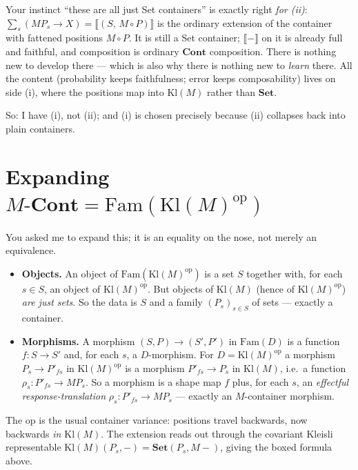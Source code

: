 \documentclass[11pt]{article}
\newcommand{\Set}{\mathbf{Set}}
\newcommand{\Cont}{\mathbf{Cont}}
\newcommand{\Kl}{\mathrm{Kl}}
\newcommand{\Fam}{\mathrm{Fam}}
\newcommand{\ext}[1]{\llbracket #1 \rrbracket}
\theoremstyle{definition}
\begin{document}
Your instinct ``these are all just Set containers'' is exactly right \emph{for (ii)}: $\sum_s(MP_s\to X)
= \ext{(S,\,M\circ P)}$ is the ordinary extension of the container with fattened positions $M\circ P$.
It is still a Set container; $\ext{-}$ on it is already full and faithful, and composition is ordinary
$\Cont$ composition. There is nothing new to develop there --- which is also why there is nothing new
to \emph{learn} there. All the content (probability keeps faithfulness; error keeps composability) lives
on side (i), where the positions map into $\Kl(M)$ rather than $\Set$.

So: I have (i), not (ii); and (i) is chosen precisely because (ii) collapses back into plain containers.

\section{Expanding $M\text{-}\Cont = \Fam(\Kl(M)^{\mathrm{op}})$}
You asked me to expand this; it is an equality on the nose, not merely an equivalence.
\begin{itemize}
  \item \textbf{Objects.} An object of $\Fam(\Kl(M)^{\mathrm{op}})$ is a set $S$ together with, for each
  $s\in S$, an object of $\Kl(M)^{\mathrm{op}}$. But objects of $\Kl(M)$ (hence of $\Kl(M)^{\mathrm{op}}$)
  \emph{are just sets}. So the data is $S$ and a family $(P_s)_{s\in S}$ of sets --- exactly a container.
  \item \textbf{Morphisms.} A morphism $(S,P)\to(S',P')$ in $\Fam(D)$ is a function $f:S\to S'$ and, for
  each $s$, a $D$-morphism. For $D=\Kl(M)^{\mathrm{op}}$ a morphism $P_s \to P'_{fs}$ in
  $\Kl(M)^{\mathrm{op}}$ is a morphism $P'_{fs}\to P_s$ in $\Kl(M)$, i.e.\ a function
  $\rho_s: P'_{fs}\to M P_s$. So a morphism is a shape map $f$ plus, for each $s$, an \emph{effectful
  response-translation} $\rho_s:P'_{fs}\to M P_s$ --- exactly an $M$-container morphism.
\end{itemize}
The $\mathrm{op}$ is the usual container variance: positions travel backwards, now backwards
\emph{in $\Kl(M)$}. The extension reads out through the covariant Kleisli representable
$\Kl(M)(P_s,-)=\Set(P_s,M-)$, giving the boxed formula above.
\end{document}

